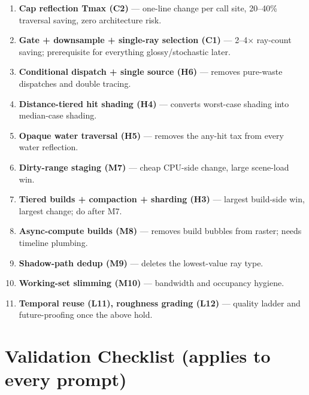 \documentclass[11pt,a4paper]{article}
\begin{document}
\begin{enumerate}
    \item \textbf{Cap reflection Tmax (C2)} --- one-line change per call site, 20--40\% traversal saving, zero architecture risk.
    \item \textbf{Gate + downsample + single-ray selection (C1)} --- 2--4$\times$ ray-count saving; prerequisite for everything glossy/stochastic later.
    \item \textbf{Conditional dispatch + single source (H6)} --- removes pure-waste dispatches and double tracing.
    \item \textbf{Distance-tiered hit shading (H4)} --- converts worst-case shading into median-case shading.
    \item \textbf{Opaque water traversal (H5)} --- removes the any-hit tax from every water reflection.
    \item \textbf{Dirty-range staging (M7)} --- cheap CPU-side change, large scene-load win.
    \item \textbf{Tiered builds + compaction + sharding (H3)} --- largest build-side win, largest change; do after M7.
    \item \textbf{Async-compute builds (M8)} --- removes build bubbles from raster; needs timeline plumbing.
    \item \textbf{Shadow-path dedup (M9)} --- deletes the lowest-value ray type.
    \item \textbf{Working-set slimming (M10)} --- bandwidth and occupancy hygiene.
    \item \textbf{Temporal reuse (L11), roughness grading (L12)} --- quality ladder and future-proofing once the above hold.
\end{enumerate}

\section{Validation Checklist (applies to every prompt)}
\end{document}
